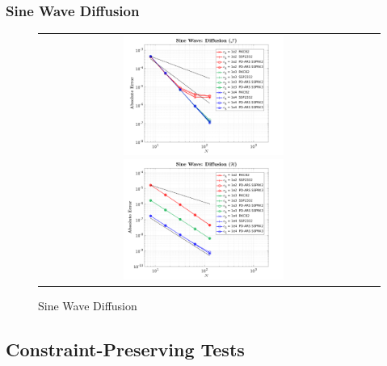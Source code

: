 \subsubsection{Sine Wave Diffusion}
\begin{figure}[h]
  \centering
  \begin{tabular}{cc}
    \includegraphics[width=0.5\textwidth]{figures/SineWaveDiffusionJ}
    \includegraphics[width=0.5\textwidth]{figures/SineWaveDiffusionH}
  \end{tabular}
   \caption{Sine Wave Diffusion}
\end{figure}

\subsection{Constraint-Preserving Tests}


